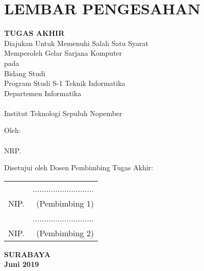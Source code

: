 \chapter{LEMBAR PENGESAHAN}
\small

\begin{center}
	\textbf{\MakeUppercase\judul}
	\vspace*{0.3em}
	
	\textbf{TUGAS AKHIR} \\
	Diajukan Untuk Memenuhi Salah Satu Syarat\\
	Memperoleh Gelar Sarjana Komputer\\
	pada\\
	Bidang Studi \rmk\\
	Program Studi S-1 Teknik Informatika\\
	Departemen Informatika \\
	\fakultas \\
	Institut Teknologi Sepuluh Nopember
	
	\vspace*{0.3em}
	
	Oleh:\\
	\textbf{\penulis} \\
	NRP. \nrp
	
	\vspace*{1.1em}
\end{center}

Disetujui oleh Dosen Pembimbing Tugas Akhir: \\
\vspace*{1.3em}

\begin{tabularx}{\linewidth}{ @{}l r }
	\pembimbingsatu & ........................... \vspace*{1.4em} \\
	NIP. \nikpembimbingsatu & (Pembimbing 1) \vspace*{2.6em} \\
	
	\pembimbingdua & ........................... \vspace*{1.4em} \\
	NIP. \nikpembimbingdua & (Pembimbing 2) \vspace*{0.9em}
\end{tabularx}

\begin{center}
	\textbf {SURABAYA} \\
	\textbf {Juni 2019}
\end{center}

\normalsize
\cleardoublepage